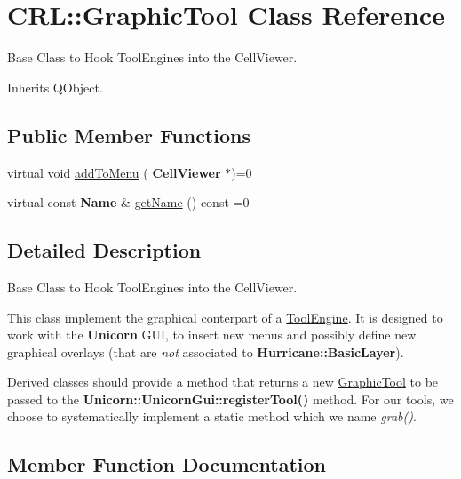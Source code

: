 \hypertarget{classCRL_1_1GraphicTool}{}\section{C\+RL\+:\+:Graphic\+Tool Class Reference}
\label{classCRL_1_1GraphicTool}


Base Class to Hook Tool\+Engines into the Cell\+Viewer.  




Inherits Q\+Object.

\subsection*{Public Member Functions}
\begin{DoxyCompactItemize}
\item 
virtual void \mbox{\hyperlink{classCRL_1_1GraphicTool_a63941f6c930c08087935ea3e276ee9a9}{add\+To\+Menu}} (\textbf{ Cell\+Viewer} $\ast$)=0
\item 
virtual const \textbf{ Name} \& \mbox{\hyperlink{classCRL_1_1GraphicTool_a4420ce085389f1f9111735031467848d}{get\+Name}} () const =0
\end{DoxyCompactItemize}


\subsection{Detailed Description}
Base Class to Hook Tool\+Engines into the Cell\+Viewer. 

This class implement the graphical conterpart of a \mbox{\hyperlink{classCRL_1_1ToolEngine}{Tool\+Engine}}. It is designed to work with the \textbf{ Unicorn} G\+UI, to insert new menus and possibly define new graphical overlays (that are {\itshape not} associated to \textbf{ Hurricane\+::\+Basic\+Layer}).

Derived classes should provide a method that returns a new \mbox{\hyperlink{classCRL_1_1GraphicTool}{Graphic\+Tool}} to be passed to the \textbf{ Unicorn\+::\+Unicorn\+Gui\+::register\+Tool()} method. For our tools, we choose to systematically implement a {\ttfamily static} method which we name {\itshape grab()}. 

\subsection{Member Function Documentation}
\mbox{\label{classCRL_1_1GraphicTool_a63941f6c930c08087935ea3e276ee9a9}} 
